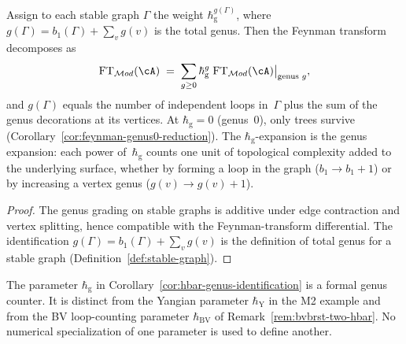 \begin{corollary}
\label{cor:hbar-genus-identification}
Assign to each stable graph $\Gamma$ the weight
$\hbar_{\mathrm{g}}^{g(\Gamma)}$, where
$g(\Gamma) = b_1(\Gamma) + \sum_v g(v)$ is the total genus.
Then the Feynman transform decomposes as
\[
\mathrm{FT}_{\mathcal{M}od}(\cA)
\;=\;
\sum_{g \ge 0} \hbar_{\mathrm{g}}^g\;
\mathrm{FT}_{\mathcal{M}od}(\cA)\big|_{\text{genus } g},
\]
and $g(\Gamma)$ equals the number of independent loops in~$\Gamma$
plus the sum of the genus decorations at its vertices. At
$\hbar_{\mathrm{g}} = 0$ (genus~$0$), only trees survive
(Corollary~\textup{\ref{cor:feynman-genus0-reduction}}). The
$\hbar_{\mathrm{g}}$-expansion is the genus expansion: each power
of~$\hbar_{\mathrm{g}}$ counts one unit of topological complexity
added to the underlying surface, whether by forming a loop in the graph
($b_1 \to b_1 + 1$) or by increasing a vertex genus
($g(v) \to g(v) + 1$).
\end{corollary}

\begin{proof}
The genus grading on stable graphs is additive under edge
contraction and vertex splitting, hence compatible with the
Feynman-transform differential. The
identification $g(\Gamma) = b_1(\Gamma) + \sum_v g(v)$ is the
definition of total genus for a stable graph
(Definition~\ref{def:stable-graph}).
\end{proof}

\begin{remark}
The parameter $\hbar_{\mathrm{g}}$ in
Corollary~\ref{cor:hbar-genus-identification} is a formal genus
counter.  It is distinct from the Yangian parameter
$\hbar_{\mathrm{Y}}$ in the M2 example and from the BV loop-counting
parameter $\hbar_{\mathrm{BV}}$ of
Remark~\ref{rem:bvbrst-two-hbar}.  No numerical specialization of
one parameter is used to define another.
\end{remark}

